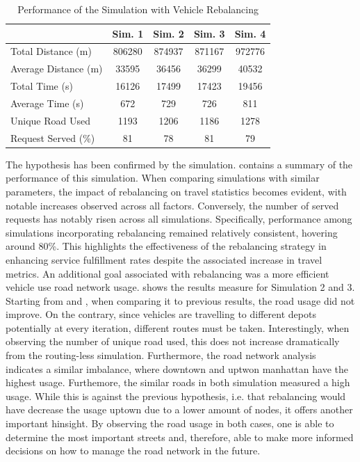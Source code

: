 \begin{table}[h]
	\centering
	\begin{tabular}{ |p{3.7cm}|c|c|c|c|}
		\hline
		& Sim. 1 & Sim. 2 & Sim. 3 & Sim. 4   \\
		\hline
		Total Distance (m)     &806280&   874937 & 871167 &  972776 \\
		Average Distance (m)  &33595 & 36456  &36299  & 40532 \\
		Total Time (s)         &16126&17499   &  17423& 19456 \\
		Average Time (s)      & 672&  729  & 726 &  811\\
		Unique Road Used 				&1193&1206&1186&1278 \\
		Request Served  (\%)&81 &  78 &  81& 79 \\
	\end{tabular}
	
	\caption{Performance of the Simulation with Vehicle Rebalancing }
	\label{tab:rebalancing_simulation}   
\end{table}
The hypothesis has been confirmed by the simulation.  contains a summary of the performance of this simulation. When comparing simulations with similar parameters, the impact of rebalancing on travel statistics becomes evident, with notable increases observed across all factors. Conversely, the number of served requests has notably risen across all simulations. Specifically, performance among simulations incorporating rebalancing remained relatively consistent, hovering around 80\%. This highlights the effectiveness of the rebalancing strategy in enhancing service fulfillment rates despite the associated increase in travel metrics. An additional goal associated with rebalancing was a more efficient vehicle use road network usage.  shows the results measure for Simulation 2 and 3. Starting from  and , when comparing it to previous results, the road usage did not improve. On the contrary, since vehicles are travelling to different depots potentially at every iteration, different routes must be taken. Interestingly, when observing the number of unique road used, this does not increase dramatically from the routing-less simulation. Furthermore, the road network analysis indicates a similar imbalance, where downtown and uptwon manhattan have the highest usage. Furthemore, the similar roads in both simulation measured a high usage. While this is against the previous hypothesis, i.e. that rebalancing would have decrease the usage uptown due to a lower amount of nodes, it offers another important hinsight. By observing the road usage in both cases, one is able to determine the most important streets and, therefore, able to make more informed decisions on how to manage the road network in the future. \\
